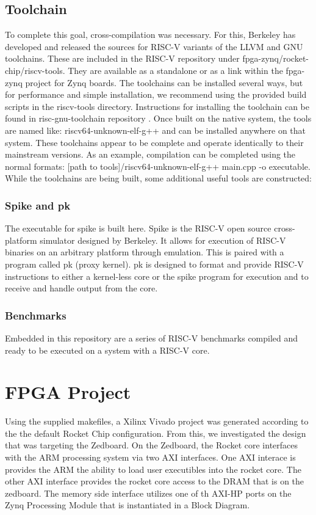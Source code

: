 \documentclass[journal]{IEEEtran}
\begin{document}
\subsection{Toolchain}
To complete this goal, cross-compilation was necessary. For this, Berkeley has developed and released the sources for RISC-V variants of the LLVM and GNU toolchains. These are included in the RISC-V repository under fpga-zynq/rocket-chip/riscv-tools. They are available as a standalone or as a link within the fpga-zynq project for Zynq boards. The toolchains can be installed several ways, but for performance and simple installation, we recommend using the provided build scripts in the riscv-tools directory. Instructions for installing the toolchain can be found in risc-gnu-toolchain repository \cite{toolchain}. Once built on the native system, the tools are named like: riscv64-unknown-elf-g++ and can be installed anywhere on that system. These toolchains appear to be complete and operate identically to their mainstream versions. As an example, compilation can be completed using the normal formats: [path to tools]/riscv64-unknown-elf-g++ main.cpp -o executable. \newline \newline While the toolchains are being built, some additional useful tools are constructed:\newline

\subsubsection{Spike and pk}
The executable for spike is built here. Spike is the RISC-V open source cross-platform simulator designed by Berkeley. It allows for execution of RISC-V binaries on an arbitrary platform through emulation. This is paired with a program called pk (proxy kernel). pk is designed to format and provide RISC-V instructions to either a kernel-less core or the spike program for execution and to receive and handle output from the core. \newline

\subsubsection{Benchmarks}
Embedded in this repository are a series of RISC-V benchmarks compiled and ready to be executed on a system with a RISC-V core. 

\section{FPGA Project}
Using the supplied makefiles, a Xilinx Vivado project was generated according to the the default Rocket Chip configuration. From this,  we investigated the design that was targeting the Zedboard.
On the Zedboard, the Rocket core interfaces with the ARM processing system via two AXI interfaces. One AXI interace is provides the ARM the ability to load user executibles into the rocket core. The other AXI interface provides the rocket core access to the DRAM that is on the zedboard. The memory side interface utilizes one of th AXI-HP ports on the Zynq Processing Module that is instantiated in a Block Diagram.
\end{document}
